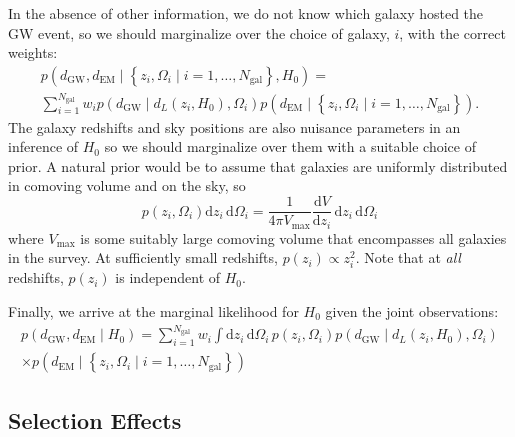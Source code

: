 \documentclass[modern]{aastex62}
\newcommand{\dd}{\mathrm{d}}
\newcommand{\dEM}{d_{\mathrm{EM}}}
\newcommand{\diff}[2]{\frac{\dd #1}{\dd #2}}
\newcommand{\dGW}{d_{\mathrm{GW}}}
\newcommand{\Ngal}{N_{\mathrm{gal}}}
\begin{document}
In the absence of other information, we do not know which galaxy hosted the
\ac{GW} event, so we should marginalize over the choice of galaxy, $i$, with the
correct weights:
%
\begin{multline}
    p\left( \dGW, \dEM \mid \left\{ z_i, \Omega_i \mid i = 1, \ldots, \Ngal \right\}, H_0 \right) = \\ \sum_{i = 1}^{\Ngal} w_i  p\left( \dGW \mid d_L\left( z_i, H_0 \right), \Omega_i \right) p\left( \dEM \mid \left\{ z_i, \Omega_i \mid i = 1, \ldots, \Ngal \right\} \right).
\end{multline}
%
The galaxy redshifts and sky positions are also nuisance parameters in an
inference of $H_0$ so we should marginalize over them with a suitable choice of
prior.  A natural prior would be to assume that galaxies are uniformly
distributed in comoving volume and on the sky, so
%
\begin{equation}
    p\left( z_i, \Omega_i \right) \dd z_i \, \dd \Omega_i = \frac{1}{4\pi V_\mathrm{max}} \diff{V}{z_i} \, \dd z_i \, \dd \Omega_i
\end{equation}
%
where $V_\mathrm{max}$ is some suitably large comoving volume that encompasses
all galaxies in the survey.  At sufficiently small redshifts, $p\left( z_i
\right) \propto z_i^2$.  Note that at \emph{all} redshifts, $p\left( z_i
\right)$ is independent of $H_0$.

Finally, we arrive at the marginal likelihood for $H_0$ given the joint
observations:
%
\begin{multline}
    \label{eq:H0-marginal-likelihood}
    p\left( \dGW, \dEM \mid H_0 \right) = \sum_{i=1}^{\Ngal} w_i \int \dd z_i \, \dd \Omega_i \, p\left( z_i, \Omega_i \right) p\left( \dGW \mid d_L\left( z_i, H_0 \right), \Omega_i \right) \\ \times p\left( \dEM \mid \left\{ z_i, \Omega_i \mid i = 1, \ldots, \Ngal \right\} \right)
\end{multline}

\subsection{Selection Effects}
\end{document}

